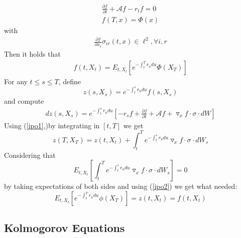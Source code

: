 \documentclass[a4paper,10pt]{report}
\theoremstyle{plain}
\theoremstyle{definition}
\newcommand\be{\begin{eqnarray}}    %
\newcommand\ee{\end{eqnarray}}
\newcommand{\AAA} {\mathcal{A} }
\begin{document}
\be
\label{ipo1}
\frac{\partial f}{\partial t}+\AAA f-r_t f=0 \\
\label{ipo2}
f(T,x)=\Phi(x)
\ee
with
\be 
\frac{\partial f}{\partial x_i} \sigma_{ir}(t,x) \in \ell^2,\forall i,r
\ee
Then it holds that
\be
f(t,X_t)= E_{t,X_t}\left[ e^{-\int_t^T r_u du} \Phi(X_T) \right] 
\ee
\proof 
For any $t\le s \le T$, define 
\[
z(s,X_s)=e^{-\int_t^s r_u du}f(s,X_s)
\]
and compute
\be
dz(s,X_s)=e^{-\int_t^s r_u du}\left[-r_s f + \frac{\partial f}{\partial t}+\AAA f + \triangledown_x f \cdot \sigma \cdot dW \right] 
\ee
Using (\ref{ipo1},)by integrating in $[t,T]$ we get
\[
z(T,X_T)=z(t,X_t) + \int_t^T e^{-\int_t^s r_u du} \triangledown_x f \cdot \sigma \cdot dW_s 
\]
Considering that
\[
E_{t,X_t}\left[\int_t^T e^{-\int_t^s r_u du} \triangledown_x f \cdot \sigma \cdot dW_s \right]=0
\]
by taking expectations of both sides and using (\ref{ipo2}) we get what needed:
\[
E_{t,X_t}\left[ e^{-\int_t^T r_u du}  \phi(X_T)\right]=z(t,X_t)=f(t,X_t)
\]


\subsection{Kolmogorov Equations}
\end{document}

